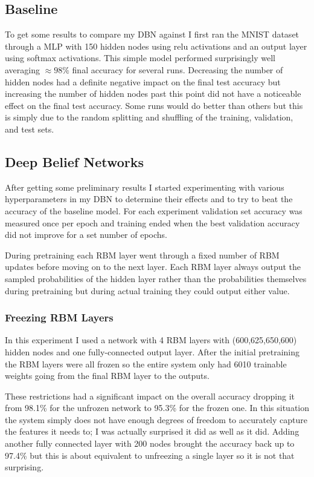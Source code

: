 \documentclass{article}
\begin{document}
	\subsection{Baseline}
	To get some results to compare my DBN against I first ran the MNIST dataset through a MLP with 150 hidden nodes using relu activations and an output layer using softmax activations. This simple model performed surprisingly well averaging $\approx 98\%$ final accuracy for several runs. Decreasing the number of hidden nodes had a definite negative impact on the final test accuracy but increasing the number of hidden nodes past this point did not have a noticeable effect on the final test accuracy. Some runs would do better than others but this is simply due to the random splitting and shuffling of the training, validation, and test sets.
	
	\subsection{Deep Belief Networks}
	After getting some preliminary results I started experimenting with various hyperparameters in my DBN to determine their effects and to try to beat the accuracy of the baseline model. For each experiment validation set accuracy was measured once per epoch and training ended when the best validation accuracy did not improve for a set number of epochs. 
	
	During pretraining each RBM layer went through a fixed number of RBM updates before moving on to the next layer. Each RBM layer always output the sampled probabilities of the hidden layer rather than the probabilities themselves during pretraining but during actual training they could output either value.
	
	\subsubsection{Freezing RBM Layers}
	In this experiment I used a network with 4 RBM layers with (600,625,650,600) hidden nodes and one fully-connected output layer. After the initial pretraining the RBM layers were all frozen so the entire system only had 6010 trainable weights going from the final RBM layer to the outputs. 
	
	These restrictions had a significant impact on the overall accuracy dropping it from 98.1\% for the unfrozen network to 95.3\% for the frozen one. In this situation the system simply does not have enough degrees of freedom to accurately capture the features it needs to; I was actually surprised it did as well as it did. Adding another fully connected layer with 200 nodes brought the accuracy back up to 97.4\% but this is about equivalent to unfreezing a single layer so it is not that surprising.
\end{document}
